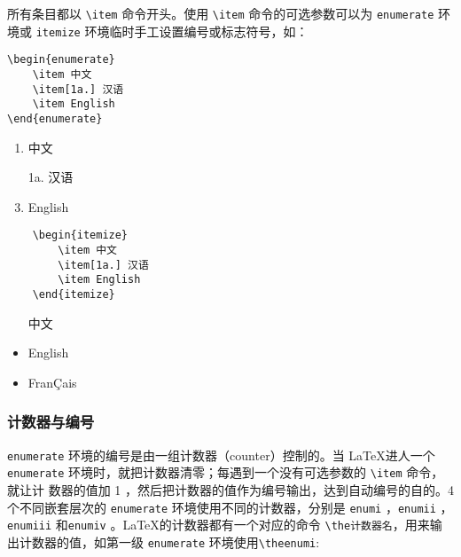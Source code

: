 所有条目都以 \verb|\item| 命令开头。使用 \verb|\item| 命令的可选参数可以为 \verb|enumerate| 环境或 \verb|itemize| 环境临时手工设置编号或标志符号，如：

\begin{minipage}[t]{0.45\textwidth}
\begin{lstlisting}
\begin{enumerate}
    \item 中文
    \item[1a.] 汉语
    \item English
\end{enumerate}
\end{lstlisting}
\end{minipage}
\hfill
\begin{minipage}[t]{0.45\textwidth}
    \begin{enumerate}
        \item 中文
        \item[1a.] 汉语
        \item English
    \end{enumerate}
\end{minipage}

\begin{minipage}[t]{0.45\textwidth}
    \begin{lstlisting}
    \begin{itemize}
        \item 中文
        \item[1a.] 汉语
        \item English
    \end{itemize}
    \end{lstlisting}
\end{minipage}
\hfill
\begin{minipage}[t]{0.45\textwidth}
    \begin{itemize}
        \item[\dag] 中文
        \item English
        \item FranÇais
    \end{itemize}
\end{minipage}

\subsubsection{计数器与编号}

\verb|enumerate| 环境的编号是由一组计数器（counter）控制的。当 \LaTeX 进人一个
\verb|enumerate| 环境时，就把计数器清零；每遇到一个没有可选参数的 \verb|\item| 命令，就让计
数器的值加 1 ，然后把计数器的值作为编号输出，达到自动编号的自的。4 个不同嵌套层次的 \verb|enumerate| 环境使用不同的计数器，分别是 \verb|enumi| ，\verb|enumii| ，\verb|enumiii| 和\verb|enumiv| 。\LaTeX 的计数器都有一个对应的命令 \verb|\the计数器名|，用来输出计数器的值，如第一级 \verb|enumerate| 环境使用\verb|\theenumi|:

